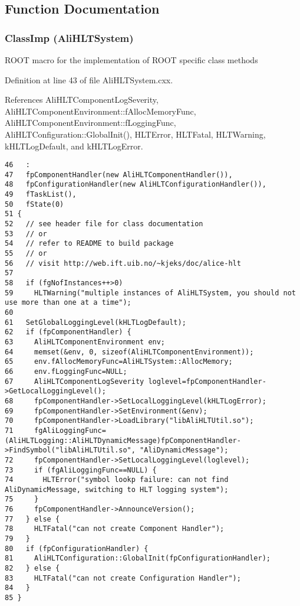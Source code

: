 \subsection{Function Documentation}
\subsubsection{\setlength{\rightskip}{0pt plus 5cm}Class\-Imp ({\bf Ali\-HLTSystem})}\label{AliHLTSystem_8cxx_a0}


ROOT macro for the implementation of ROOT specific class methods 

Definition at line 43 of file Ali\-HLTSystem.cxx.

References Ali\-HLTComponent\-Log\-Severity, Ali\-HLTComponent\-Environment::f\-Alloc\-Memory\-Func, Ali\-HLTComponent\-Environment::f\-Logging\-Func, Ali\-HLTConfiguration::Global\-Init(), HLTError, HLTFatal, HLTWarning, k\-HLTLog\-Default, and k\-HLTLog\-Error.

\footnotesize\begin{verbatim}46   :
47   fpComponentHandler(new AliHLTComponentHandler()),
48   fpConfigurationHandler(new AliHLTConfigurationHandler()),
49   fTaskList(),
50   fState(0)
51 {
52   // see header file for class documentation
53   // or
54   // refer to README to build package
55   // or
56   // visit http://web.ift.uib.no/~kjeks/doc/alice-hlt
57 
58   if (fgNofInstances++>0)
59     HLTWarning("multiple instances of AliHLTSystem, you should not use more than one at a time");
60 
61   SetGlobalLoggingLevel(kHLTLogDefault);
62   if (fpComponentHandler) {
63     AliHLTComponentEnvironment env;
64     memset(&env, 0, sizeof(AliHLTComponentEnvironment));
65     env.fAllocMemoryFunc=AliHLTSystem::AllocMemory;
66     env.fLoggingFunc=NULL;
67     AliHLTComponentLogSeverity loglevel=fpComponentHandler->GetLocalLoggingLevel();
68     fpComponentHandler->SetLocalLoggingLevel(kHLTLogError);
69     fpComponentHandler->SetEnvironment(&env);
70     fpComponentHandler->LoadLibrary("libAliHLTUtil.so");
71     fgAliLoggingFunc=(AliHLTLogging::AliHLTDynamicMessage)fpComponentHandler->FindSymbol("libAliHLTUtil.so", "AliDynamicMessage");
72     fpComponentHandler->SetLocalLoggingLevel(loglevel);
73     if (fgAliLoggingFunc==NULL) {
74       HLTError("symbol lookp failure: can not find AliDynamicMessage, switching to HLT logging system");
75     }
76     fpComponentHandler->AnnounceVersion();
77   } else {
78     HLTFatal("can not create Component Handler");
79   }
80   if (fpConfigurationHandler) {
81     AliHLTConfiguration::GlobalInit(fpConfigurationHandler);
82   } else {
83     HLTFatal("can not create Configuration Handler");
84   }
85 }

\end{verbatim}\normalsize 


